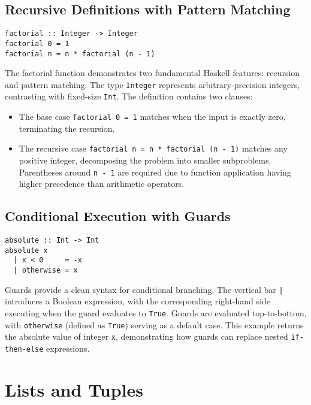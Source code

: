 \documentclass{book}
\begin{document}
\subsection{Recursive Definitions with Pattern Matching}
\begin{lstlisting}
factorial :: Integer -> Integer
factorial 0 = 1
factorial n = n * factorial (n - 1)
\end{lstlisting}

The factorial function demonstrates two fundamental Haskell features: recursion and pattern matching. The type \texttt{Integer} represents arbitrary-precision integers, contrasting with fixed-size \texttt{Int}. The definition contains two clauses:

\begin{itemize}
\item The base case \texttt{factorial 0 = 1} matches when the input is exactly zero, terminating the recursion.

\item The recursive case \texttt{factorial n = n * factorial (n - 1)} matches any positive integer, decomposing the problem into smaller subproblems. Parentheses around \texttt{n - 1} are required due to function application having higher precedence than arithmetic operators.
\end{itemize}

\subsection{Conditional Execution with Guards}
\begin{lstlisting}
absolute :: Int -> Int
absolute x
  | x < 0     = -x
  | otherwise = x
\end{lstlisting}

Guards provide a clean syntax for conditional branching. The vertical bar \texttt{|} introduces a Boolean expression, with the corresponding right-hand side executing when the guard evaluates to \texttt{True}. Guards are evaluated top-to-bottom, with \texttt{otherwise} (defined as \texttt{True}) serving as a default case. This example returns the absolute value of integer \texttt{x}, demonstrating how guards can replace nested \texttt{if-then-else} expressions.

\section{Lists and Tuples}
\label{sec:collections}
\end{document}
